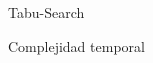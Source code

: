 \begin{section}{Tabu-Search}
\begin{subsection}{Complejidad temporal}
	\end{subsection}

\end{section}
